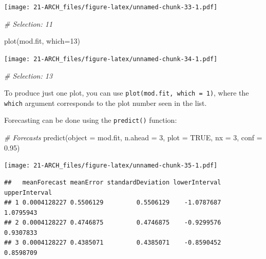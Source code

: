 \documentclass[
]{book}
\newenvironment{Shaded}{\begin{snugshade}}{\end{snugshade}}
\newcommand{\AttributeTok}[1]{\textcolor[rgb]{0.77,0.63,0.00}{#1}}
\newcommand{\CommentTok}[1]{\textcolor[rgb]{0.56,0.35,0.01}{\textit{#1}}}
\newcommand{\ConstantTok}[1]{\textcolor[rgb]{0.00,0.00,0.00}{#1}}
\newcommand{\DecValTok}[1]{\textcolor[rgb]{0.00,0.00,0.81}{#1}}
\newcommand{\FloatTok}[1]{\textcolor[rgb]{0.00,0.00,0.81}{#1}}
\newcommand{\FunctionTok}[1]{\textcolor[rgb]{0.00,0.00,0.00}{#1}}
\newcommand{\NormalTok}[1]{#1}
\theoremstyle{definition}
\theoremstyle{definition}
\theoremstyle{definition}
\theoremstyle{definition}
\theoremstyle{remark}
\begin{document}
\texttt{[image: 21-ARCH\_files/figure-latex/unnamed-chunk-33-1.pdf]}

\begin{Shaded}
\begin{Highlighting}[]
\CommentTok{\# Selection: 11}
\end{Highlighting}
\end{Shaded}

\begin{Shaded}
\begin{Highlighting}[]
\FunctionTok{plot}\NormalTok{(mod.fit, }\AttributeTok{which=}\DecValTok{13}\NormalTok{)}
\end{Highlighting}
\end{Shaded}

\texttt{[image: 21-ARCH\_files/figure-latex/unnamed-chunk-34-1.pdf]}

\begin{Shaded}
\begin{Highlighting}[]
\CommentTok{\# Selection: 13}
\end{Highlighting}
\end{Shaded}

To produce just one plot, you can use \texttt{plot(mod.fit,\ which\ =\ 1)}, where the \texttt{which} argument corresponds to the plot number seen in the list.

Forecasting can be done using the \texttt{predict()} function:

\begin{Shaded}
\begin{Highlighting}[]
\CommentTok{\# Forecasts }
\FunctionTok{predict}\NormalTok{(}\AttributeTok{object =}\NormalTok{ mod.fit, }\AttributeTok{n.ahead =} \DecValTok{3}\NormalTok{, }\AttributeTok{plot =} \ConstantTok{TRUE}\NormalTok{, }\AttributeTok{nx =} 
    \DecValTok{3}\NormalTok{, }\AttributeTok{conf =} \FloatTok{0.95}\NormalTok{)}
\end{Highlighting}
\end{Shaded}

\texttt{[image: 21-ARCH\_files/figure-latex/unnamed-chunk-35-1.pdf]}

\begin{verbatim}
##   meanForecast meanError standardDeviation lowerInterval upperInterval
## 1 0.0004128227 0.5506129         0.5506129    -1.0787687     1.0795943
## 2 0.0004128227 0.4746875         0.4746875    -0.9299576     0.9307833
## 3 0.0004128227 0.4385071         0.4385071    -0.8590452     0.8598709
\end{verbatim}
\end{document}
